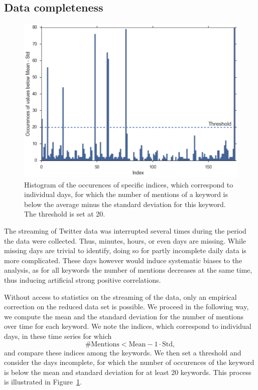 \documentclass[12pt, a4paper]{article}
\begin{document}
\subsection{Data completeness}
\begin{figure}
\centering
\includegraphics[width=\linewidth]{figs/incomplete_data.pdf}
\caption{Histogram of the occurences of specific indices, which correspond to individual days, for which the number of mentions of a keyword is below the average minus the standard deviation for this keyword. The threshold is set at 20.}
\label{fig:incomplete}
\end{figure}

The streaming of Twitter data was interrupted several times during the period the data were collected. Thus, minutes, hours, or even days are missing. While missing days are trivial to identify, doing so for partly incomplete daily data is more complicated. These days however would induce systematic biases to the analysis, as for all keywords the number of mentions decreases at the same time, thus inducing artificial strong positive correlations.

Without access to statistics on the streaming of the data, only an empirical correction on the reduced data set is possible. We proceed in the following way, we compute the mean and the standard deviation for the number of mentions over time for each keyword. We note the indices, which correspond to individual days, in these time series for which
\begin{equation}
\# \mathrm{Mentions} < \mathrm{Mean} - 1\cdot\mathrm{Std},
\end{equation}
and compare these indices among the keywords. We then set a threshold and consider the days incomplete, for which the number of occurences of the keyword is below the mean and standard deviation for at least 20 keywords. This process is illustrated in Figure~\ref{fig:incomplete}. 
\end{document}
